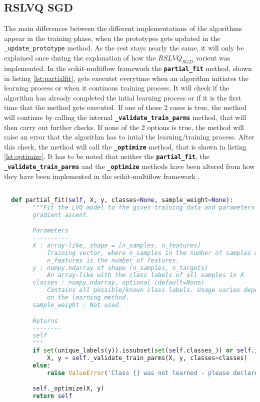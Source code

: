 \documentclass[12pt,oneside,a4paper,parskip]{scrbook}
\begin{document}
\subsection{RSLVQ SGD}
The main differences between the different implementations of the algorithms appear in the training phase, when the prototypes
gets updated in the \texttt{\_update\_prototype} method. As the rest stays nearly the same, it will only be explained once during the explanation of how the $RSLVQ_\textit{SGD}$
varient was implemented.
In the scikit-multiflow framework the \textbf{\texttt{partial\_fit}} method, shown in listing \ref{lst:partialfit}, gets executet everytime when an algorithm initiates the
learning process or when it continous training process. It will check if the algorithm has already completed the intial 
learning process or if it is the first time that the method gets executed. If one of those 2 cases is true, the method will
continue by calling the internal \textbf{\texttt{\_validate\_train\_parms}} method, that will then carry out further checks.
If none of the 2 options is true, the method will raise an error that the algorithm has to intial the learning/training process.
After this check, the method will call the \textbf{\texttt{\_optimize}} method, that is shown in listing \ref{lst:optimize}.
It has to be noted that neither the \textbf{\texttt{partial\_fit}}, the \textbf{\texttt{\_validate\_train\_parms}} and the \textbf{\texttt{\_optimize}} methods
have been altered from how they have been implemented in the scikit-multiflow framework \cite{skmultiflow}.

\begin{lstlisting}[label=lst:partialfit,
  language=python,
  firstnumber=1,
  caption=Method \texttt{partial\_fit} from the scikit-multiflow framework]			   

  def partial_fit(self, X, y, classes=None, sample_weight=None):
        """Fit the LVQ model to the given training data and parameters using
        gradient ascent.

        Parameters
        ----------
        X : array-like, shape = [n_samples, n_features]
            Training vector, where n_samples in the number of samples and
            n_features is the number of features.
        y : numpy.ndarray of shape (n_samples, n_targets)
            An array-like with the class labels of all samples in X
        classes : numpy.ndarray, optional (default=None)
            Contains all possible/known class labels. Usage varies depending
            on the learning method.
        sample_weight : Not used.

        Returns
        --------
        self
        """
        if set(unique_labels(y)).issubset(set(self.classes_)) or self.initial_fit is True:
            X, y = self._validate_train_parms(X, y, classes=classes)
        else:
            raise ValueError('Class {} was not learned - please declare all classes in first call of fit/partial_fit'.format(y))

        self._optimize(X, y)
        return self
\end{lstlisting}
\end{document}
